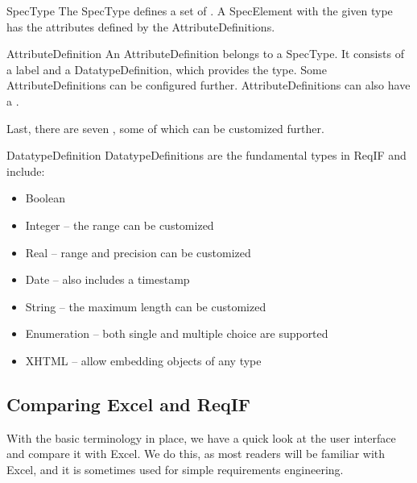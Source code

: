 \begin{definition}{SpecType}
The SpecType defines a set of .  A SpecElement with the given type has the attributes defined by the AttributeDefinitions.
\end{definition}

\begin{definition}{AttributeDefinition}
An AttributeDefinition belongs to a SpecType. It consists of a label and a DatatypeDefinition, which provides the type.  Some AttributeDefinitions can be configured further.  AttributeDefinitions can also have a .
\end{definition}

Last, there are seven , some of which can be customized further.

\begin{definition}{DatatypeDefinition}
DatatypeDefinitions are the fundamental types in ReqIF and include:
\begin{itemize}
\item Boolean
\item Integer -- the range can be customized
\item Real -- range and precision can be customized
\item Date -- also includes a timestamp
\item String -- the maximum length can be customized
\item Enumeration -- both single and multiple choice are supported
\item XHTML -- allow embedding objects of any type
\end{itemize}
\end{definition}

\subsection{Comparing Excel and ReqIF}

With the basic terminology in place, we have a quick look at the \pror{} user interface and compare it with Excel.  We do this, as most readers will be familiar with Excel, and it is sometimes used for simple requirements engineering. 

